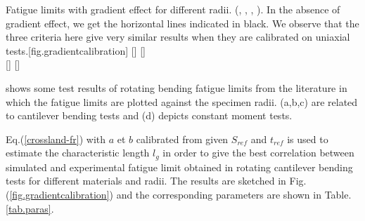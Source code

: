 \newpage
\begin{Figure}[!h]{Fatigue limits with gradient effect for different radii. (\cite{Massonnet1955},  \cite{Moore1944},  \cite{Pogoretskii1966},  \cite{Papadopoulos1996513}). In the absence of gradient effect, we get the horizontal lines indicated in black. We observe that the three criteria here give very similar results when they are calibrated on uniaxial tests.}[fig.gradientcalibration]
[]
[]
\\
[]
[]
\end{Figure}

 shows some test results of rotating bending fatigue limits
from the literature in which the fatigue limits are plotted against
the specimen radii. (a,b,c) are related to cantilever bending
tests and (d) depicts constant moment tests.

Eq.(\ref{crossland-fr}) with $a$ et $b$ calibrated from given $S_{ref}$ and $t_{ref}$ is used to estimate the characteristic length $l_g$ in order to give the best correlation between simulated and experimental fatigue limit obtained in rotating cantilever bending tests for different materials and radii. The results are sketched in Fig.(\ref{fig.gradientcalibration}) and the corresponding parameters are shown in Table.\ref{tab.paras}.

